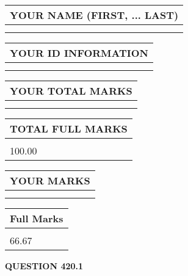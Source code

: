 \documentclass{ctexart}
\begin{document}
   
   
   
\newpage 
\setcounter{page}{ 
   420001 } 
   
   
   
   
\noindent\begin{tabular}{|l|}
\hline
YOUR NAME (FIRST, ... LAST)  \\
\hline
 \\ 
 \\ 
\hline
\end{tabular}
\hspace{0.05in} \begin{tabular}{|l|}
\hline
 YOUR   ID   INFORMATION  \\
\hline
 \\ 
 \\ 
\hline
\end{tabular}
   
   
\vspace{0.2in}\noindent\begin{tabular}{|l|}
\hline
YOUR TOTAL MARKS  \\
\hline
 \\ 
 \\ 
\hline
\end{tabular}
\hspace{0.05in} \begin{tabular}{|l|}
\hline
TOTAL FULL MARKS  \\
\hline
 \\ 
100.00 \\
\hline
\end{tabular}
   
   
 \vspace{0.2in}
 
 
 
 
   
   
  
\vspace{0.2in}
  
\noindent\begin{tabular}{|l|}
\hline
 YOUR MARKS  \\
\hline
 \\ 
 \\ 
\hline
\end{tabular}
\hspace{0.05in} \begin{tabular}{|l|}
\hline
 Full Marks  \\
\hline
 \\ 
66.67 \\
\hline
\end{tabular}
{\textbf{\Large{QUESTION
420.1 
}}}
  
\end{document}
